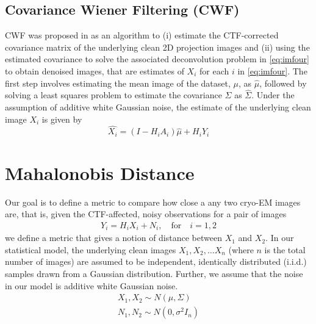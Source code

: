 \documentclass{article}
\begin{document}
\subsection{Covariance Wiener Filtering (CWF)}
CWF was proposed in \cite{cwf} as an algorithm to (i) estimate the CTF-corrected covariance matrix of the underlying clean 2D projection images and (ii) using the estimated covariance to solve the associated deconvolution problem in \ref{eq:imfour} to obtain denoised images, that are estimates of $X_i$ for each $i$ in 
\ref{eq:imfour}. The first step involves estimating the mean image of the dataset, $\mu$, as $\hat{\mu}$, followed by solving a least squares problem to estimate the covariance $\Sigma$ as $\hat{\Sigma}$. Under the assumption of additive white Gaussian noise, the estimate of the underlying clean image $X_i$ is given by
\begin{equation}
\hat{X_i}=(I-H_iA_i)\hat{\mu} + H_iY_i
\end{equation}
%
\section{Mahalonobis Distance}
Our goal is to define a metric to compare how close a any two cryo-EM images are, that is, given the CTF-affected, noisy observations for a pair of images
\begin{eqnarray} 
Y_i=H_i X_i + N_i, \quad \text{for} \quad i=1,2 
\end{eqnarray}
we define a metric that gives a notion of distance between $X_1$ and $X_2$. In our statistical model, the underlying clean images $X_1, X_2, \ldots X_n$ (where $n$ is the total number of images) are assumed to be independent, identically distributed (i.i.d.) samples drawn from a Gaussian distribution. Further, we assume that the noise in our model is additive white Gaussian noise.
\begin{eqnarray} 
X_1, X_2  \sim N( {\mu},\Sigma) \nonumber \\ 
N_1, N_2  \sim N(0,{\sigma}^2 I_n )
\end{eqnarray}
\end{document}
